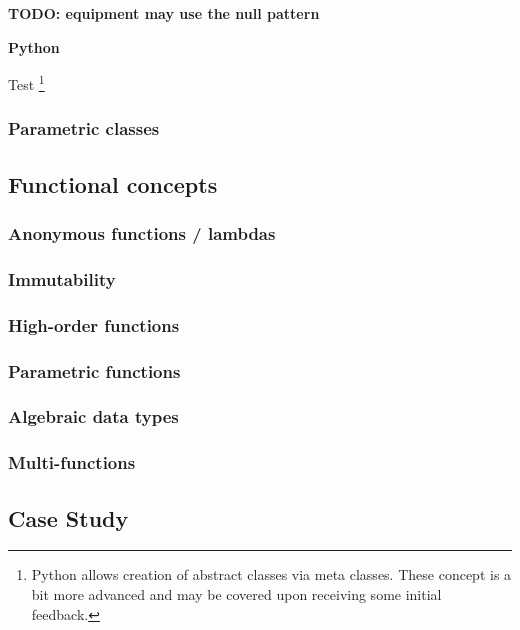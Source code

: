 \documentclass[]{article}
\let\rmarkdownfootnote\footnote%
\def\footnote{\protect\rmarkdownfootnote}
\begin{document}
\textbf{TODO: equipment may use the null pattern}

\textbf{Python}

Test \footnote{Python allows creation of abstract classes via meta
  classes. These concept is a bit more advanced and may be covered upon
  receiving some initial feedback.}

\subsubsection{Parametric classes}\label{parametric-classes}

\subsection{Functional concepts}\label{functional-concepts}

\subsubsection{Anonymous functions /
lambdas}\label{anonymous-functions-lambdas}

\subsubsection{Immutability}\label{immutability}

\subsubsection{High-order functions}\label{high-order-functions}

\subsubsection{Parametric functions}\label{parametric-functions}

\subsubsection{Algebraic data types}\label{algebraic-data-types}

\subsubsection{Multi-functions}\label{multi-functions}

\subsection{Case Study}\label{case-study}
\end{document}
